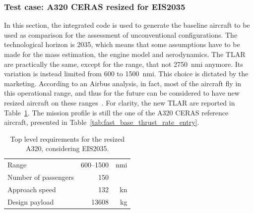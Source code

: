 \subsubsection{Test case: A320 CERAS resized for EIS2035}
\label{subsubsec:chap2_a320_optim_eis2035}

In this section, the integrated code is used to generate the baseline aircraft to be used as comparison for the assessment of unconventional configurations.
The technological horizon is 2035, which means that some assumptions have to be made for the mass estimation, the engine model and aerodynamics. 
The TLAR are practically the same, except for the range, that not 2750~nmi anymore. 
Its variation is instead limited from 600 to 1500~nmi.
This choice is dictated by the marketing.
According to an Airbus analysis, in fact, most of the aircraft fly in this operational range, and thus for the future can be considered to have new resized aircraft on these ranges~\cite{bib:airbus_global_market}. 
For clarity, the new TLAR are reported in Table~\ref{tab:a320_2035_tlar}. 
The mission profile is still the one of the A320 CERAS reference aircraft, presented in Table~\ref{tab:fast_base_thrust_rate_entry}. 
\begin{table}[!h]
	\centering
	\begin{tabular}{l r r}
		\hline
		Range & 600--1500 & nmi \\
		Number of passengers & 150 & \\
		Approach speed & 132 & \si{\knot} \\
		Design payload & 13608 & \si{\kilogram} \\
		\hline		
	\end{tabular}
	\caption{Top level requirements for the resized A320, considering EIS2035.}
	\label{tab:a320_2035_tlar}
\end{table} 

